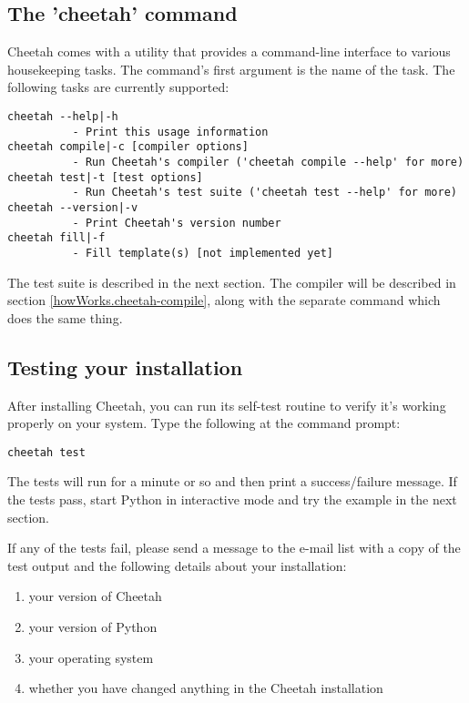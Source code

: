 \subsection{The 'cheetah' command}
\label{gettingStarted.cheetah}

Cheetah comes with a utility  that provides a command-line
interface to various housekeeping tasks.  The command's first argument is
the name of the task.  The following tasks are currently supported:

\begin{verbatim}
cheetah --help|-h            
          - Print this usage information
cheetah compile|-c [compiler options]
          - Run Cheetah's compiler ('cheetah compile --help' for more)
cheetah test|-t [test options]
          - Run Cheetah's test suite ('cheetah test --help' for more)
cheetah --version|-v
          - Print Cheetah's version number
cheetah fill|-f
          - Fill template(s) [not implemented yet]
\end{verbatim}

The test suite is described in the next section.  The compiler will be
described in section \ref{howWorks.cheetah-compile}, along with the
separate  command which does the same thing.

\subsection{Testing your installation}
\label{gettingStarted.test}

After installing Cheetah, you can run its self-test routine to verify it's
working properly on your system.  Type the following at the command prompt:
\begin{verbatim}
cheetah test 
\end{verbatim}

The tests will run for a minute or so and then print a success/failure message.
If the tests pass, start Python in interactive mode and try the example in the
next section.

If any of the tests fail, please send a message to the e-mail list with a copy
of the test output and the following details about your installation:

\begin{enumerate}
\item your version of Cheetah
\item your version of Python
\item your operating system
\item whether you have changed anything in the Cheetah installation
\end{enumerate}

